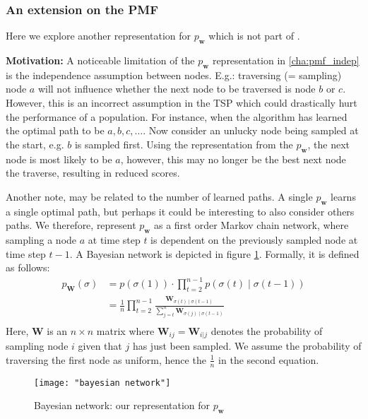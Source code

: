 \documentclass[a4paper,10pt]{article}
\newcommand{\matr}[1]{\mathbf{#1}}
\begin{document}
	\subsubsection{An extension on the PMF}
	Here we explore another representation for $p_\mathbf{w}$ which is not part of \cite{santucci_gradient_2020, ceberiojosu_model-based_2023}. 
	
	\textbf{Motivation:} A noticeable limitation of the $p_\mathbf{w}$ representation in \ref{cha:pmf_indep} is the independence assumption between nodes. E.g.: traversing (= sampling) node $a$ will not influence whether the next node to be traversed is node $b$ or $c$. However, this is an incorrect assumption in the TSP which could drastically hurt the performance of a population. For instance, when the algorithm has learned the optimal path to be $a, b, c, \dots $. Now consider an unlucky node being sampled at the start, e.g. $b$ is sampled first. Using the representation from the $p_\mathbf{w}$, the next node is most likely to be $a$, however, this may no longer be the best next node the traverse, resulting in reduced scores.
	
	Another note, may be related to the number of learned paths. A single $p_\mathbf{w}$ learns a single optimal path, but perhaps it could be interesting to also consider others paths. We therefore, represent $p_\mathbf{w}$ as a first order Markov chain network, where sampling a node $a$ at time step $t$ is dependent on the previously sampled node at time step $t-1$. A Bayesian network is depicted in figure \ref{fig:bayesian-network}. Formally, it is defined as follows:
	$$
	\begin{aligned}
		p_\matr{W}(\sigma) &= p\left(\sigma(1)\right) \cdot \prod_{t=2}^{n-1} p\left(\sigma(t) \mid \sigma(t-1) \right) \\
						   &= \frac{1}{n} \prod_{t=2}^{n-1} \frac{\matr{W}_{\sigma(t) \mid \sigma(t-1)}}{\sum_{j=t}^n \matr{W}_{\sigma(j) \mid \sigma(t-1)}} \\
	\end{aligned}
	$$
	Here, $\matr{W}$ is an $n \times n$ matrix where $\matr{W}_{ij} = \matr{W}_{i | j}$ denotes the probability of sampling node $i$ given that $j$ has just been sampled. We assume the probability of traversing the first node as uniform, hence the $\frac{1}{n}$ in the second equation.
	
	\begin{figure}
		\centering
		\texttt{[image: "bayesian network"]}
		\caption{Bayesian network: our representation for $p_\mathbf{w}$}
		\label{fig:bayesian-network}
	\end{figure}
	
\end{document}
